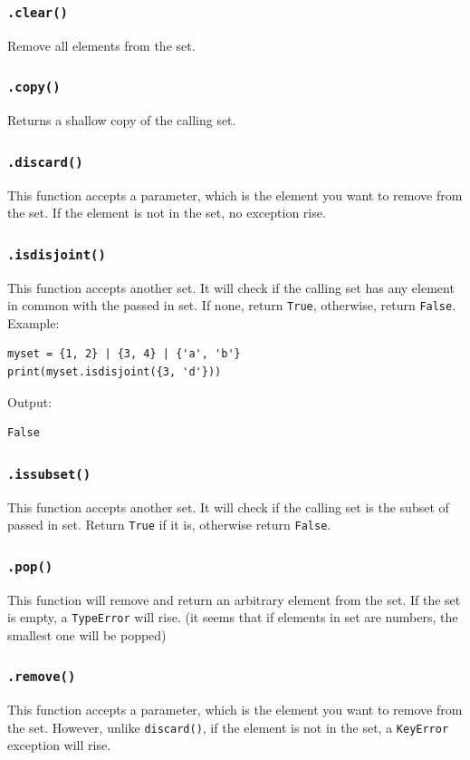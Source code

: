 \documentclass[12pt]{book}
\begin{document}
\subsubsection{\texttt{.clear()}}
\label{sec:org6a05985}
Remove all elements from the set.
\subsubsection{\texttt{.copy()}}
\label{sec:org836349f}
Returns a shallow copy of the calling set.

\subsubsection{\texttt{.discard()}}
\label{sec:org35aec63}
This function accepts a parameter, which is the element you want to remove from the set. If the element is not in the set, no exception rise.
\subsubsection{\texttt{.isdisjoint()}}
\label{sec:org958656f}
This function accepts another set. It will check if the calling set has any element in common with the passed in set. If none, return \texttt{True}, otherwise, return \texttt{False}. Example:
\begin{verbatim}
myset = {1, 2} | {3, 4} | {'a', 'b'}
print(myset.isdisjoint({3, 'd'}))
\end{verbatim}
Output:
\begin{verbatim}
False
\end{verbatim}
\subsubsection{\texttt{.issubset()}}
\label{sec:org3cf11ed}
This function accepts another set. It will check if the calling set is the subset of passed in set. Return \texttt{True} if it is, otherwise return \texttt{False}.
\subsubsection{\texttt{.pop()}}
\label{sec:orgbf75205}
This function will remove and return an arbitrary element from the set. If the set is empty, a \texttt{TypeError} will rise. (it seems that if elements in set are numbers, the smallest one will be popped)
\subsubsection{\texttt{.remove()}}
\label{sec:org298f50f}
This function accepts a parameter, which is the element you want to remove from the set. However, unlike \texttt{discard()}, if the element is not in the set, a \texttt{KeyError} exception will rise.
\end{document}
